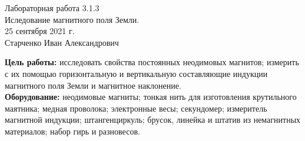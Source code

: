



\begin{center}
  \LARGE{Лабораторная работа 3.1.3}\\[0.2cm]
  \LARGE{Иследование магнитного поля Земли.}\\[0.2cm]
  \large{25 сентября 2021 г.}\\[0.2cm]
  \large{Старченко Иван Александрович}\\[0.2cm]
\end{center}

\textbf{Цель работы:}  исследовать свойства постоянных неодимовых магнитов;
измерить с их помощью горизонтальную и вертикальную составляющие
индукции магнитного поля Земли и магнитное наклонение.
\\

\textbf{Оборудование:} неодимовые магниты; тонкая нить для изготовления крутильного маятника; медная проволока; электронные весы; секундомер; измеритель магнитной индукции; штангенциркуль; брусок, линейка
и штатив из немагнитных материалов; набор гирь и разновесов.

